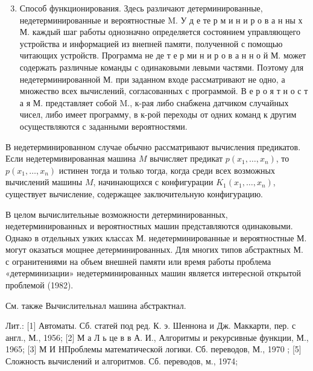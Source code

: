 \documentclass[10pt]{article}
\begin{document}
\begin{enumerate}

  \setcounter{enumi}{2}

  \item Способ функционирования. Здесь различают детерминированные, недетерминированные и вероятностные M. У д е те р м и н и р о в а н ны х М. каждый шаг работы однозначно определяется состоянием управляющего устройства и информацией из внепней памяти, полученной с помощью читающих устройств. Программа не де т е р ми н и р о в а н н о й М. может содержать различные команды с одинаковыми левыми частями. Поэтому для недетерминированной М. при заданном входе рассматривают не одно, а множество всех вычислений, согласованных с программой. В е р о я т н о с т а я М. представляет собой M., к-рая либо снабжена датчиком случайных чисел, либо имеет программу, в к-рой переходы от одних команд к другим осуществляются с заданными вероятностями.

\end{enumerate}



В недетерминированном случае обычно рассматривают вычисления предикатов. Если недетермивированная машина $M$ вычисляет предикат $p\left(x_{1}, \ldots, x_{n}\right)$, то $p\left(x_{1}, \ldots, x_{n}\right)$ истинен тогда и только тогда, когда среди всех возможных вычислений машины $M$, начинающихся с конфигурации $K_{1}\left(x_{1}, \ldots, x_{n}\right)$, существует вычисление, содержащее заключительную конфигурацию.



В целом вычислительные возможности детерминированных, недетерминированных и вероятностных машин представляются одинаковыми. Однако в отдельных узких классах М. недетерминированные и вероятностные М. могут оказаться мощнее детерминированных. Для многих типов абстрактных М. с огранитениями на объем внешней памяти или время работы проблема «детерминизации» недетерминированных машин является интересной открытой проблемой (1982).



См. также Вычислительнал машина абстрактнал.



Лит.: [1] Автоматы. Сб. статей под ред. К. э. Шеннона и Дж. Маккарти, пер. с англ., М., 1956; [2] М а Л ь це в в А. И., Алгоритмы и рекурсивные функции, М., 1965; [3] М И НПроблемы математической логики. С̈б. переводов, М., 1970 ; [5] Сложность вычислений и алгоритмов. Сб. переводов, м., 1974;
\end{document}
